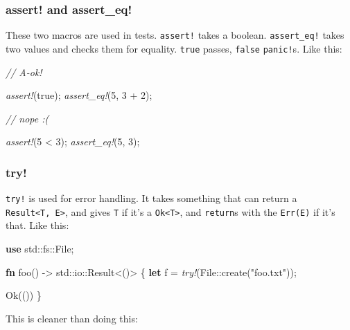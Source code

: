 \documentclass[a4paper,]{book}
\newenvironment{Shaded}{\begin{snugshade}}{\end{snugshade}}
\newcommand{\KeywordTok}[1]{\textcolor[rgb]{0.13,0.29,0.53}{\textbf{{#1}}}}
\newcommand{\DataTypeTok}[1]{\textcolor[rgb]{0.13,0.29,0.53}{{#1}}}
\newcommand{\DecValTok}[1]{\textcolor[rgb]{0.00,0.00,0.81}{{#1}}}
\newcommand{\ConstantTok}[1]{\textcolor[rgb]{0.00,0.00,0.00}{{#1}}}
\newcommand{\StringTok}[1]{\textcolor[rgb]{0.31,0.60,0.02}{{#1}}}
\newcommand{\CommentTok}[1]{\textcolor[rgb]{0.56,0.35,0.01}{\textit{{#1}}}}
\newcommand{\PreprocessorTok}[1]{\textcolor[rgb]{0.56,0.35,0.01}{\textit{{#1}}}}
\newcommand{\NormalTok}[1]{{#1}}
\begin{document}
\subsubsection{assert! and assert\_eq!}\label{assert-and-assertux5feq}

These two macros are used in tests. \texttt{assert!} takes a boolean.
\texttt{assert\_eq!} takes two values and checks them for equality.
\texttt{true} passes, \texttt{false} \texttt{panic!}s. Like this:

\begin{Shaded}
\begin{Highlighting}[]
\CommentTok{// A-ok!}

\PreprocessorTok{assert!}\NormalTok{(}\ConstantTok{true}\NormalTok{);}
\PreprocessorTok{assert_eq!}\NormalTok{(}\DecValTok{5}\NormalTok{, }\DecValTok{3} \NormalTok{+ }\DecValTok{2}\NormalTok{);}

\CommentTok{// nope :(}

\PreprocessorTok{assert!}\NormalTok{(}\DecValTok{5} \NormalTok{< }\DecValTok{3}\NormalTok{);}
\PreprocessorTok{assert_eq!}\NormalTok{(}\DecValTok{5}\NormalTok{, }\DecValTok{3}\NormalTok{);}
\end{Highlighting}
\end{Shaded}

\subsubsection{try!}\label{try}

\texttt{try!} is used for error handling. It takes something that can
return a \texttt{Result\textless{}T,\ E\textgreater{}}, and gives
\texttt{T} if it's a \texttt{Ok\textless{}T\textgreater{}}, and
\texttt{return}s with the \texttt{Err(E)} if it's that. Like this:

\begin{Shaded}
\begin{Highlighting}[]
\KeywordTok{use} \NormalTok{std::fs::File;}

\KeywordTok{fn} \NormalTok{foo() -> std::io::}\DataTypeTok{Result}\NormalTok{<()> \{}
    \KeywordTok{let} \NormalTok{f = }\PreprocessorTok{try!}\NormalTok{(File::create(}\StringTok{"foo.txt"}\NormalTok{));}

    \ConstantTok{Ok}\NormalTok{(())}
\NormalTok{\}}
\end{Highlighting}
\end{Shaded}

This is cleaner than doing this:
\end{document}
